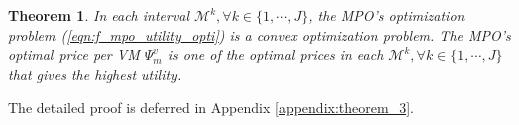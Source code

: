 \documentclass[10pt,journal, compsoc]{IEEEtran}
\newtheorem{theorem}{Theorem}
\begin{document}
\begin{theorem} \label{thm:f_mpo_convex_optimization}
In each interval $\mathcal{M}^k, \forall k \in \{1, \cdots, J\}$, the MPO's optimization problem (\ref{eqn:f_mpo_utility_opti}) is a convex optimization problem. The MPO's optimal price per VM $\Psi_m^v$ is one of the optimal prices in each $\mathcal{M}^k, \forall k \in \{1, \cdots, J\}$ that gives the highest utility.
\end{theorem}
The detailed proof is deferred in Appendix \ref{appendix:theorem_3}.
\end{document}
